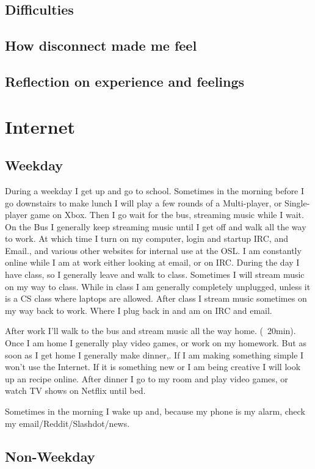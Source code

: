\documentclass[12pt,letterpaper]{article}
\begin{document}
\subsection{Difficulties}
\subsection{How disconnect made me feel}
\subsection{Reflection on experience and feelings}


\section{Internet}
\subsection{Weekday}
During a weekday I get up and go to school. Sometimes in the morning
before I go downstairs to make lunch I will play a few rounds of a
Multi-player, or Single-player game on Xbox. Then I go wait for the bus,
streaming music while I wait. On the Bus I generally keep streaming
music until I get off and walk all the way to work. At which time I
turn on my computer, login and startup IRC, and Email., and various
other websites for internal use at the OSL. I am constantly online while
I am at work either looking at email, or on IRC. During the day I have
class, so I generally leave and walk to class. Sometimes I will stream
music on my way to class. While in class I am generally completely
unplugged, unless it is a CS class where laptops are allowed.  After
class I stream music sometimes on my way back to work.  Where I plug
back in and am on IRC and email.

After work I'll walk to the bus and stream music all the way home.
(~20min). Once I am home I generally play video games, or work on my
homework. But as soon as I get home I generally make dinner,. If I am
making something simple I won't use the Internet. If it is something new
or I am being creative I will look up an recipe online. After dinner I
go to my room and play video games, or watch TV shows on Netflix until
bed.

Sometimes in the morning I wake up and, because my phone is my alarm,
check my email/Reddit/Slashdot/news.


\subsection{Non-Weekday}
\end{document}
